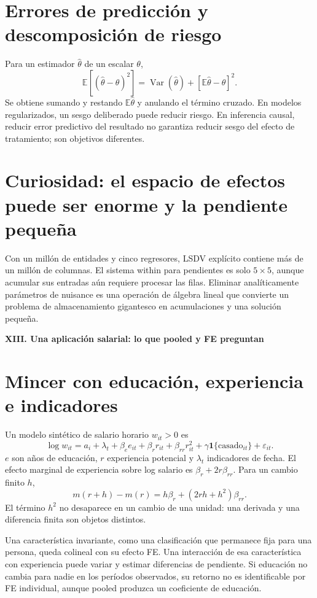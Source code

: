 \documentclass[11pt,a4paper]{article}
\newcommand{\E}{\mathbb E}
\newcommand{\ind}{\mathbf 1}
\DeclareMathOperator{\Var}{Var}
\theoremstyle{definition}
\newcommand{\parte}[1]{\par\bigskip\Needspace{8\baselineskip}\begin{center}{\Large\bfseries\color{azul}#1}\end{center}}
\newcounter{problema}
\newcommand{\eps}{\varepsilon}
\begin{document}
\section{Errores de predicción y descomposición de riesgo}
Para un estimador $\widehat\theta$ de un escalar $\theta$,
\[
\E[(\widehat\theta-\theta)^2]
=\Var(\widehat\theta)+[\E\widehat\theta-\theta]^2.
\]
Se obtiene sumando y restando $\E\widehat\theta$ y anulando el término cruzado.
En modelos regularizados, un sesgo deliberado puede reducir riesgo.
En inferencia causal, reducir error predictivo del resultado no garantiza reducir sesgo del efecto de tratamiento; son objetivos diferentes.

\section{Curiosidad: el espacio de efectos puede ser enorme y la pendiente pequeña}
Con un millón de entidades y cinco regresores, LSDV explícito contiene más de un millón de columnas.
El sistema within para pendientes es solo $5\times5$, aunque acumular sus entradas aún requiere procesar las filas.
Eliminar analíticamente parámetros de nuisance es una operación de álgebra lineal que convierte un problema de almacenamiento gigantesco en acumulaciones y una solución pequeña.



\parte{XIII. Una aplicación salarial: lo que pooled y FE preguntan}
\section{Mincer con educación, experiencia e indicadores}
Un modelo sintético de salario horario $w_{it}>0$ es
\[
\log w_{it}=a_i+\lambda_t+\beta_e e_{it}
+\beta_r r_{it}+\beta_{rr}r_{it}^2+\gamma\ind\{\text{casado}_{it}\}
+\eps_{it}.
\]
$e$ son años de educación, $r$ experiencia potencial y $\lambda_t$ indicadores de fecha.
El efecto marginal de experiencia sobre log salario es
$\beta_r+2r\beta_{rr}$.
Para un cambio finito $h$,
\[
m(r+h)-m(r)=h\beta_r+(2rh+h^2)\beta_{rr}.
\]
El término $h^2$ no desaparece en un cambio de una unidad: una derivada y una diferencia finita son objetos distintos.

Una característica invariante, como una clasificación que permanece fija para una persona, queda colineal con su efecto FE. Una interacción de esa característica con experiencia puede variar y estimar diferencias de pendiente.
Si educación no cambia para nadie en los períodos observados, su retorno no es identificable por FE individual, aunque pooled produzca un coeficiente de educación.
\end{document}
